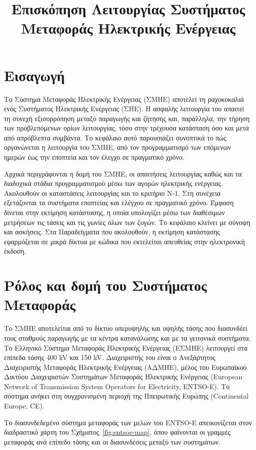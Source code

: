 \title{Επισκόπηση Λειτουργίας Συστήματος Μεταφοράς Ηλεκτρικής Ενέργειας}

\section{Εισαγωγή}
\label{kef-01-theoria}

Το Σύστημα Μεταφοράς Ηλεκτρικής Ενέργειας (ΣΜΗΕ) αποτελεί τη ραχοκοκαλιά ενός Συστήματος
Ηλεκτρικής Ενέργειας (ΣΗΕ). Η ασφαλής λειτουργία του απαιτεί τη συνεχή εξισορρόπηση μεταξύ
παραγωγής και ζήτησης και, παράλληλα, την τήρηση των προβλεπόμενων ορίων λειτουργίας, τόσο στην τρέχουσα κατάσταση όσο
και μετά από απρόβλεπτα συμβάντα. Το κεφάλαιο αυτό παρουσιάζει συνοπτικά το πώς οργανώνεται η
λειτουργία του ΣΜΗΕ, από τον προγραμματισμό των επόμενων ημερών έως την εποπτεία και τον
έλεγχο σε πραγματικό χρόνο.

Αρχικά περιγράφονται η δομή του ΣΜΗΕ, οι απαιτήσεις λειτουργίας καθώς και τα
διαδοχικά στάδια προγραμματισμού μέσω των αγορών ηλεκτρικής ενέργειας. Ακολουθούν οι καταστάσεις λειτουργίας και το κριτήριο N-1. Στη συνέχεια εξετάζονται τα συστήματα εποπτείας και ελέγχου σε πραγματικό χρόνο.
Έμφαση δίνεται στην εκτίμηση κατάστασης, η οποία υπολογίζει μέσω των διαθέσιμων μετρήσεων τις
τάσεις και τις γωνίες όλων των ζυγών. Το κεφάλαιο κλείνει με σύνοψη και ασκήσεις. Στα
Παραδείγματα που ακολουθούν, η εκτίμηση κατάστασης εφαρμόζεται σε μικρά δίκτυα με κώδικα που
εκτελείται απευθείας στην ηλεκτρονική έκδοση.


\section{Ρόλος και δομή του Συστήματος Μεταφοράς}

Το ΣΜΗΕ αποτελείται από το δίκτυο υπερυψηλής και υψηλής τάσης που διασυνδέει τους σταθμούς παραγωγής με τα κέντρα κατανάλωσης και με τα γειτονικά
συστήματα. Το Ελληνικό Σύστημα Μεταφοράς Ηλεκτρικής Ενέργειας (ΕΣΜΗΕ) λειτουργεί στα επίπεδα
τάσης 400 kV και 150 kV. Διαχειριστής του είναι ο Ανεξάρτητος Διαχειριστής Μεταφοράς
Ηλεκτρικής Ενέργειας (ΑΔΜΗΕ), μέλος του Ευρωπαϊκού Δικτύου Διαχειριστών Συστημάτων Μεταφοράς
Ηλεκτρικής Ενέργειας (European Network of Transmission System
Operators for Electricity, ENTSO-E). Το σύστημα ανήκει στη
συγχρονισμένη περιοχή της Ηπειρωτικής Ευρώπης (Continental Europe, CE).

Το διασυνδεδεμένο σύστημα μεταφοράς των μελών του ENTSO-E απεικονίζεται στον διαδραστικό
χάρτη του Σχήματος~\ref{fig:entsoe-map}, όπου φαίνονται οι γραμμές μεταφοράς ανά επίπεδο
τάσης και οι διασυνδέσεις μεταξύ των συστημάτων.

